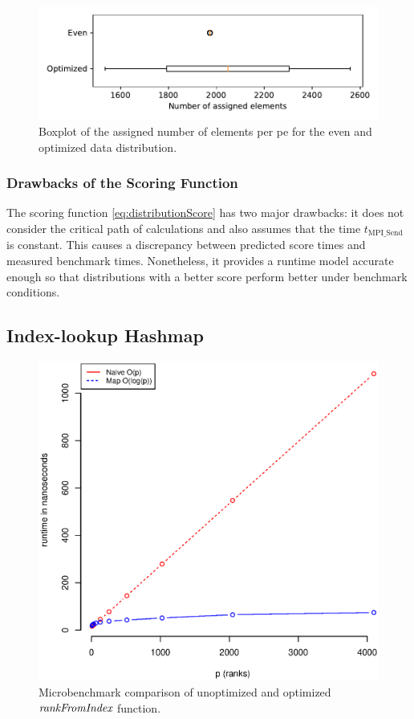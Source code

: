 \begin{figure}
\centering
\includegraphics[scale=0.75]{figures/optimizedDistributionBoxplot.pdf}
\caption{Boxplot of the assigned number of elements per \gls{pe} for the even and optimized data distribution.}
\label{fig:distributionBoxplot}
\end{figure}


\subsubsection{Drawbacks of the Scoring Function}
\label{sec:ScoringFunctionDrawbacks}
The scoring function \eqref{eq:distributionScore} has two major drawbacks:
it does not consider the critical path of calculations and also assumes that the time $t_\textrm{MPI\_Send}$ is constant.
This causes a discrepancy between predicted score times and measured benchmark times.
Nonetheless, it provides a runtime model accurate enough so that distributions with a better score perform better under benchmark conditions.


\subsection{Index-lookup Hashmap}
\label{sec:IndexLookupHashmap}

\begin{figure}
\centering
\includegraphics[scale=0.65]{figures/microbenchmark_rank_from_index.eps}
\caption{Microbenchmark comparison of unoptimized and optimized $\textit{rankFromIndex}$ function.}
\label{fig:microbenchmarkRankFromIndex}

\end{figure}

